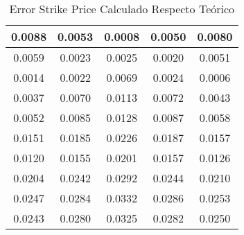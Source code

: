 \begin{table}                                
\centering                                   
\begin{tabular}{|c|c|c|c|c|}                 
\hline                                       
0.0088 & 0.0053 & 0.0008 & 0.0050 & 0.0080 \\
\hline                                       
0.0059 & 0.0023 & 0.0025 & 0.0020 & 0.0051 \\
\hline                                       
0.0014 & 0.0022 & 0.0069 & 0.0024 & 0.0006 \\
\hline                                       
0.0037 & 0.0070 & 0.0113 & 0.0072 & 0.0043 \\
\hline                                       
0.0052 & 0.0085 & 0.0128 & 0.0087 & 0.0058 \\
\hline                                       
0.0151 & 0.0185 & 0.0226 & 0.0187 & 0.0157 \\
\hline                                       
0.0120 & 0.0155 & 0.0201 & 0.0157 & 0.0126 \\
\hline                                       
0.0204 & 0.0242 & 0.0292 & 0.0244 & 0.0210 \\
\hline                                       
0.0247 & 0.0284 & 0.0332 & 0.0286 & 0.0253 \\
\hline                                       
0.0243 & 0.0280 & 0.0325 & 0.0282 & 0.0250 \\
\hline                                       
\end{tabular}                                
\caption{Error Strike Price Calculado Respecto Teórico}                     
\label{table:MyTableLabel}                   
\end{table}    


